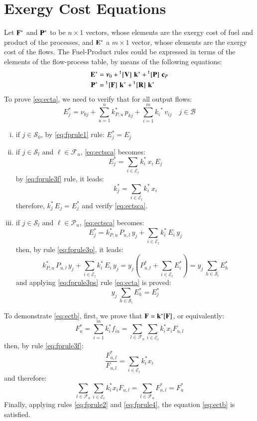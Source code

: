 \documentclass{ecos2018}
\begin{document}
\section{Exergy Cost Equations}
Let $\mathbf{F}^*$ and $\mathbf{P}^*$ to be $n\times1$ vectors, whose elements are the exergy cost of fuel and product of the processes, and $\mathbf{E}^*$ a $m\times1$ vector, whose elements are the exergy cost of the flows.
The Fuel-Product rules could be expressed in terms of the elements of the flow-process table, by means of the following equations:
\begin{align}
\mathbf{E}^{*}&=\bm{\nu}_0+\prescript{\smash{\mathsf{t}}}{}{\mskip-1mu}\left[ \textbf{V} \right]\,\mathbf{k}^{*}+\prescript{\smash{\mathsf{t}}}{}{\mskip-1mu}\left[ \textbf{P} \right]\,\mathbf{c}_P \label{eq:ecta}\\
\mathbf{P}^{*}&= \prescript{\smash{\mathsf{t}}}{}{\mskip-1mu}\left[ \textbf{F} \right]\,\mathbf{k}^{*}+ \prescript{\smash{\mathsf{t}}}{}{\mskip-1mu}\left[ \textbf{R} \right]\,\mathbf{k}^{*} \label{eq:ectb}
\end{align}
To prove \cref{eq:ecta}, we need to verify that for all output flows:
\begin{equation}
\label{eq:ectsca}
E_{j}^{*}=\nu_{0j}+\sum_{u=1}^{n}{k_{P,u}^{*}\,p_{kj}+\sum_{i=1}^{m}{k_{i}}^{*}\,v_{ij}} \quad j\in\mathcal{B}
\end{equation}
\begin{enumerate}[i)]
	\item if $j\in\mathcal{S}_0$, by \ref{eq:fprule1} rule: $E_j^*=E_j$
	\item if $j\in\mathcal{S}_l$ and $\ell\in\mathcal{F}_u$, \cref{eq:ectsca} becomes:
	\[
	E_j^*=\sum_{i\in\mathcal{E}_l}{k_i^*\,x_i\,E_j}
	\]
	by \ref{eq:fprule3f} rule, it leads:
	\[
	k_j^*=\sum_{i\in\mathcal{E}_l}{k_i^*\,x_i}
	\]
	therefore, $k_j^*\,E_j=E_j^*$ and verify \cref{eq:ectsca}.
	\item if $j\in\mathcal{S}_l$ and $\ell\in\mathcal{P}_u$, \cref{eq:ectsca} becomes:
	\[
	E_j^*=k_{P,u}^*\,P_{u,l}\,y_j+\sum_{i\in\mathcal{E}_l}{k_i^*\,E_i\,y_j} 
	\]
	then, by rule \ref{eq:fprule3p}, it leads:
	\[
	k_{P,u}^*\,P_{u,l}\,y_j+\sum_{i\in\mathcal{E}_l}{k_i^*\,E_i\,y_j}=
	y_j\left(P_{u,l}^{*}+\sum_{i\in\mathcal{E}_l}{E_i^*}\right)=y_j\,\sum_{h\in\mathcal{S}_l}{E_h^*}
	\]
	and applying \ref{eq:fprule3ps} rule \cref{eq:ecta} is proved:
	\[
	y_j\,\sum_{h\in\mathcal{S}_l}{E_h^*}=E_j^*
	\]
\end{enumerate}
To demonstrate \cref{eq:ectb}, first, we prove that $\mathbf{F}=\mathbf{k}^*[\mathbf{F}]$, or equivalently:
\begin{equation}
F_u^*=\sum_{i=1}^{m}{k_i^* f_{iu}}=\sum_{l\in\mathcal{F}_u}{\sum_{i\in\mathcal{E}_l}{k_i^* x_i F_{u,l}}}
\end{equation}
then, by rule \ref{eq:fprule3f}:
\[
\frac{F_{u,l}^*}{F_{u,l}}=\sum_{i\in\mathcal{E}_l}{k_i^*x_i}
\]
and therefore:
\[
\sum_{l\in\mathcal{F}_u}{\sum_{i\in\mathcal{E}_l}{k_i^* x_i F_{u,l}}=\sum_{l\in\mathcal{F}_u}{F_{u,l}^*}}=F_u^*
\]
Finally, applying rules \ref{eq:fprule2} and \ref{eq:fprule4}, the equation \eqref{eq:ectb} is satisfied.
\end{document}
